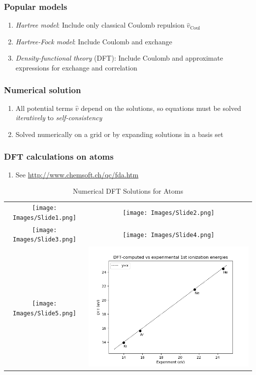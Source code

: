 \documentclass[11pt]{article}
\begin{document}
\subsubsection{Popular models}
\label{sec:orgd1f567d}
\begin{enumerate}
\item \emph{Hartree model}: Include only classical Coulomb repulsion \(\hat v_\mathrm{Coul}\)
\item \emph{Hartree-Fock model}: Include Coulomb and exchange
\item \emph{Density-functional theory} (DFT): Include Coulomb and
approximate expressions for exchange and correlation
\end{enumerate}
\subsubsection{Numerical solution}
\label{sec:orgd46e2f2}
\begin{enumerate}
\item All potential terms \(\hat v\) depend on the solutions, so  equations must be solved \emph{iteratively} to \emph{self-consistency}
\item Solved numerically on a grid or by expanding solutions in a basis set
\end{enumerate}
\subsubsection{DFT calculations on atoms}
\label{sec:org5b93bed}
\begin{enumerate}
\item See \url{http://www.chemsoft.ch/qc/fda.htm}
\end{enumerate}

\begin{table}[]
   \caption{Numerical DFT Solutions for Atoms }
\begin{tabular}{cc}
\texttt{[image: Images/Slide1.png]} & \texttt{[image: Images/Slide2.png]} \\
\texttt{[image: Images/Slide3.png]} & \texttt{[image: Images/Slide4.png]} \\
\texttt{[image: Images/Slide5.png]} & \includegraphics[scale=0.5]{Images/Ionization.png} 
\end{tabular}
\end{table}
\end{document}
